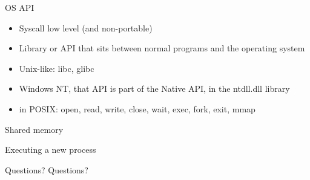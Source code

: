 \documentclass{beamer}
\begin{document}
\begin{frame}{OS API}
    \begin{itemize}
    \item Syscall low level (and non-portable)
    \item Library or API that sits between normal programs and the
      operating system 
    \item Unix-like: libc, glibc
    \item Windows NT, that API is part of the Native API, in the
      ntdll.dll library
    \item in POSIX: open, read, write, close, wait, exec, fork, exit, mmap
    \end{itemize}
\end{frame}


\begin{frame}{Shared memory}
\begin{center}
\end{center}
\end{frame}

\begin{frame}{Executing a new process}
\end{frame}

\begin{frame}{Questions?}
    Questions?
\end{frame}
\end{document}
